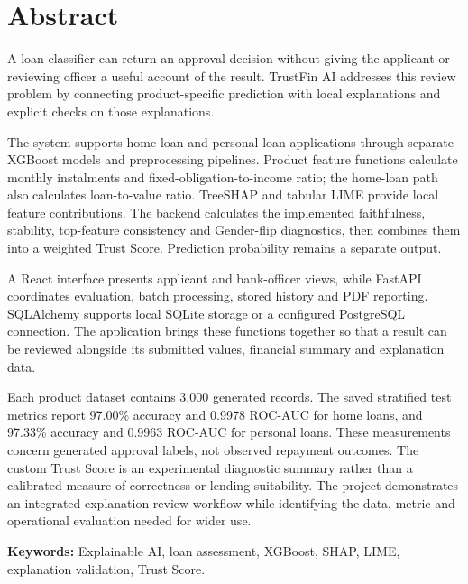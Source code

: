 \chapter*{Abstract}

A loan classifier can return an approval decision without giving the applicant or reviewing officer a useful account of the result. TrustFin AI addresses this review problem by connecting product-specific prediction with local explanations and explicit checks on those explanations.

The system supports home-loan and personal-loan applications through separate XGBoost models and preprocessing pipelines. Product feature functions calculate monthly instalments and fixed-obligation-to-income ratio; the home-loan path also calculates loan-to-value ratio. TreeSHAP and tabular LIME provide local feature contributions. The backend calculates the implemented faithfulness, stability, top-feature consistency and Gender-flip diagnostics, then combines them into a weighted Trust Score. Prediction probability remains a separate output.

A React interface presents applicant and bank-officer views, while FastAPI coordinates evaluation, batch processing, stored history and PDF reporting. SQLAlchemy supports local SQLite storage or a configured PostgreSQL connection. The application brings these functions together so that a result can be reviewed alongside its submitted values, financial summary and explanation data.

Each product dataset contains 3,000 generated records. The saved stratified test metrics report 97.00\% accuracy and 0.9978 ROC-AUC for home loans, and 97.33\% accuracy and 0.9963 ROC-AUC for personal loans. These measurements concern generated approval labels, not observed repayment outcomes. The custom Trust Score is an experimental diagnostic summary rather than a calibrated measure of correctness or lending suitability. The project demonstrates an integrated explanation-review workflow while identifying the data, metric and operational evaluation needed for wider use.

\noindent\textbf{Keywords:} Explainable AI, loan assessment, XGBoost, SHAP, LIME, explanation validation, Trust Score.
\clearpage
